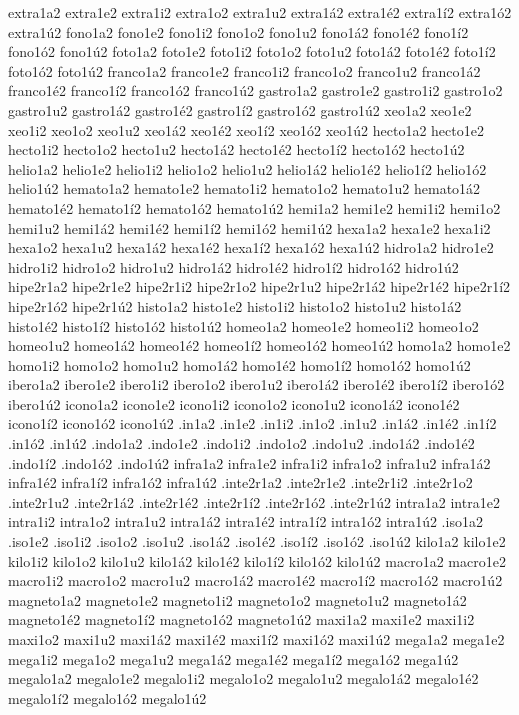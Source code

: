 {extra1a2 extra1e2 extra1i2 extra1o2 extra1u2 extra1á2 extra1é2 extra1í2 extra1ó2 extra1ú2 
fono1a2 fono1e2 fono1i2 fono1o2 fono1u2 fono1á2 fono1é2 fono1í2 fono1ó2 fono1ú2 
foto1a2 foto1e2 foto1i2 foto1o2 foto1u2 foto1á2 foto1é2 foto1í2 foto1ó2 foto1ú2 
franco1a2 franco1e2 franco1i2 franco1o2 franco1u2 franco1á2 franco1é2 franco1í2 franco1ó2 franco1ú2 
gastro1a2 gastro1e2 gastro1i2 gastro1o2 gastro1u2 gastro1á2 gastro1é2 gastro1í2 gastro1ó2 gastro1ú2 
xeo1a2 xeo1e2 xeo1i2 xeo1o2 xeo1u2 xeo1á2 xeo1é2 xeo1í2 xeo1ó2 xeo1ú2 
hecto1a2 hecto1e2 hecto1i2 hecto1o2 hecto1u2 hecto1á2 hecto1é2 hecto1í2 hecto1ó2 hecto1ú2 
helio1a2 helio1e2 helio1i2 helio1o2 helio1u2 helio1á2 helio1é2 helio1í2 helio1ó2 helio1ú2 
hemato1a2 hemato1e2 hemato1i2 hemato1o2 hemato1u2 hemato1á2 hemato1é2 hemato1í2 hemato1ó2 hemato1ú2 
hemi1a2 hemi1e2 hemi1i2 hemi1o2 hemi1u2 hemi1á2 hemi1é2 hemi1í2 hemi1ó2 hemi1ú2 
hexa1a2 hexa1e2 hexa1i2 hexa1o2 hexa1u2 hexa1á2 hexa1é2 hexa1í2 hexa1ó2 hexa1ú2 
hidro1a2 hidro1e2 hidro1i2 hidro1o2 hidro1u2 hidro1á2 hidro1é2 hidro1í2 hidro1ó2 hidro1ú2 
hipe2r1a2 hipe2r1e2 hipe2r1i2 hipe2r1o2 hipe2r1u2 hipe2r1á2 hipe2r1é2 hipe2r1í2 hipe2r1ó2 hipe2r1ú2 
histo1a2 histo1e2 histo1i2 histo1o2 histo1u2 histo1á2 histo1é2 histo1í2 histo1ó2 histo1ú2 
homeo1a2 homeo1e2 homeo1i2 homeo1o2 homeo1u2 homeo1á2 homeo1é2 homeo1í2 homeo1ó2 homeo1ú2 
homo1a2 homo1e2 homo1i2 homo1o2 homo1u2 homo1á2 homo1é2 homo1í2 homo1ó2 homo1ú2 
ibero1a2 ibero1e2 ibero1i2 ibero1o2 ibero1u2 ibero1á2 ibero1é2 ibero1í2 ibero1ó2 ibero1ú2 
icono1a2 icono1e2 icono1i2 icono1o2 icono1u2 icono1á2 icono1é2 icono1í2 icono1ó2 icono1ú2 
.in1a2 .in1e2 .in1i2 .in1o2 .in1u2 .in1á2 .in1é2 .in1í2 .in1ó2 .in1ú2 
.indo1a2 .indo1e2 .indo1i2 .indo1o2 .indo1u2 .indo1á2 .indo1é2 .indo1í2 .indo1ó2 .indo1ú2 
infra1a2 infra1e2 infra1i2 infra1o2 infra1u2 infra1á2 infra1é2 infra1í2 infra1ó2 infra1ú2 
.inte2r1a2 .inte2r1e2 .inte2r1i2 .inte2r1o2 .inte2r1u2 .inte2r1á2 .inte2r1é2 .inte2r1í2 .inte2r1ó2 .inte2r1ú2 
intra1a2 intra1e2 intra1i2 intra1o2 intra1u2 intra1á2 intra1é2 intra1í2 intra1ó2 intra1ú2 
.iso1a2 .iso1e2 .iso1i2 .iso1o2 .iso1u2 .iso1á2 .iso1é2 .iso1í2 .iso1ó2 .iso1ú2 
kilo1a2 kilo1e2 kilo1i2 kilo1o2 kilo1u2 kilo1á2 kilo1é2 kilo1í2 kilo1ó2 kilo1ú2 
macro1a2 macro1e2 macro1i2 macro1o2 macro1u2 macro1á2 macro1é2 macro1í2 macro1ó2 macro1ú2 
magneto1a2 magneto1e2 magneto1i2 magneto1o2 magneto1u2 magneto1á2 magneto1é2 magneto1í2 magneto1ó2 magneto1ú2 
maxi1a2 maxi1e2 maxi1i2 maxi1o2 maxi1u2 maxi1á2 maxi1é2 maxi1í2 maxi1ó2 maxi1ú2 
mega1a2 mega1e2 mega1i2 mega1o2 mega1u2 mega1á2 mega1é2 mega1í2 mega1ó2 mega1ú2 
megalo1a2 megalo1e2 megalo1i2 megalo1o2 megalo1u2 megalo1á2 megalo1é2 megalo1í2 megalo1ó2 megalo1ú2 
}
